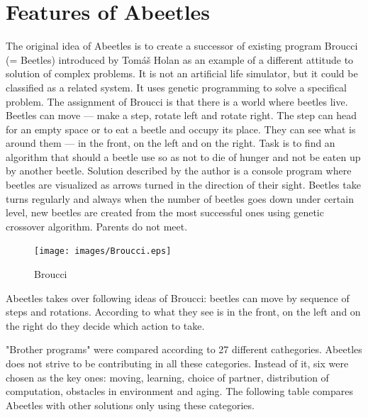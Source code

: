 \documentclass[a4paper,12pt]{report}
\begin{document}
\section{Features of Abeetles}
The original idea of Abeetles is to create a successor of existing program Broucci (= Beetles) introduced by Tom\'{a}\v{s} Holan as an example of a different attitude to solution of complex problems. It is not an artificial life simulator, but it could be classified as a related system. It uses genetic programming to solve a specifical problem. The assignment of Broucci is that there is a world where beetles live. Beetles can move --- make a step, rotate left and rotate right. The step can head for an empty space or to eat a beetle and occupy its place. They can see what is around them --- in the front, on the left and on the right. Task is to find an algorithm that should a beetle use so as not to die of hunger and not be eaten up by another beetle. Solution described by the author is a console program where beetles are visualized as arrows turned in the direction of their sight. Beetles take turns regularly and always when the number of beetles goes down under certain level, new beetles are created from the most successful ones using genetic crossover algorithm. Parents do not meet.\cite{Broucci}

\begin{figure}
\begin{center}
  \texttt{[image: images/Broucci.eps]}
  \caption{Broucci}
  \label{img.Broucci}
\end{center}
\end{figure}

Abeetles takes over following ideas of Broucci: beetles can move by sequence of steps and rotations. According to what they see is in the front, on the left and on the right do they decide which action to take. 
 

"Brother programs" were compared according to 27 different cathegories. Abeetles does not strive to be contributing in all these categories. Instead of it, six were chosen as the key ones: moving, learning, choice of partner, distribution of computation, obstacles in environment and aging. The following table compares Abeetles with other solutions only using these categories.
\end{document}
